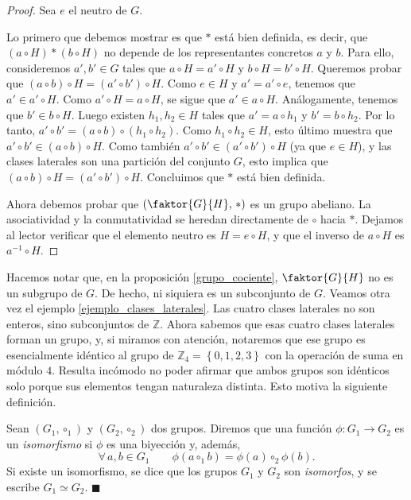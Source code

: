 \begin{proof}
Sea $e$ el neutro de $G$.

Lo primero que debemos mostrar es que $\ast$ está bien definida, es decir, que $\left(a \circ H \right) \ast \left( b \circ H \right)$ no depende de los representantes concretos $a$ y $b$. Para ello, consideremos $a', b' \in G$ tales que $a \circ H = a' \circ H$ y $b \circ H = b' \circ H$. Queremos probar que $(a \circ b) \circ H = (a' \circ b') \circ H$. Como $e \in H$ y $a' = a' \circ e$, tenemos que $a' \in a' \circ H$. Como $a' \circ H = a \circ H$, se sigue que $a' \in a \circ H$. Análogamente, tenemos que $b' \in b \circ H$. Luego existen $h_1, h_2 \in H$ tales que $a' = a \circ h_1$ y $b' = b \circ h_2$. Por lo tanto, $a' \circ b' = (a \circ b) \circ (h_1 \circ h_2)$. Como $h_1 \circ h_2 \in H$, esto último muestra que $a' \circ b' \in (a \circ b) \circ H$. Como también $a' \circ b' \in (a' \circ b') \circ H$ (ya que $e \in H$), y las clases laterales son una partición del conjunto $G$, esto implica que $(a \circ b) \circ H = (a' \circ b') \circ H$. Concluimos que $\ast$ está bien definida.

Ahora debemos probar que $\left(\faktor{G}{H},\, \ast\right)$ es un grupo abeliano. La asociatividad y la conmutatividad se heredan directamente de $\circ$ hacia $\ast$. Dejamos al lector verificar que el elemento neutro es $H = e \circ H$, y que el inverso de $a \circ H$ es $a^{-1} \circ H$.
\end{proof}

Hacemos notar que, en la proposición \ref{grupo_cociente}, $\faktor{G}{H}$ no es un subgrupo de $G$. De hecho, ni siquiera es un subconjunto de $G$. Veamos otra vez el ejemplo \ref{ejemplo_clases_laterales}. Las cuatro clases laterales no son enteros, sino subconjuntos de $\mathbb{Z}$. Ahora sabemos que esas cuatro clases laterales forman un grupo, y, si miramos con atención, notaremos que ese grupo es esencialmente idéntico al grupo de $\mathbb{Z}_4 = \left\{0, 1, 2, 3\right\}$ con la operación de suma en módulo $4$. Resulta incómodo no poder afirmar que ambos grupos son idénticos solo porque sus elementos tengan naturaleza distinta. Esto motiva la siguiente definición.

\begin{definition} \label{isomorfismo_de_grupo}
Sean $(G_1, \circ_1)$ y $(G_2, \circ_2)$ dos grupos. Diremos que una función $\phi\colon G_1 \rightarrow G_2$ es un \emph{isomorfismo} si $\phi$ es una biyección y, además,
$$\forall\, a, b \in G_1 \qquad \phi(a \circ_1 b) = \phi(a) \circ_2 \phi(b).$$
Si existe un isomorfismo, se dice que los grupos $G_1$ y $G_2$ son \emph{isomorfos}, y se escribe $G_1 \simeq G_2$. \hfill$\blacksquare$
\end{definition}

